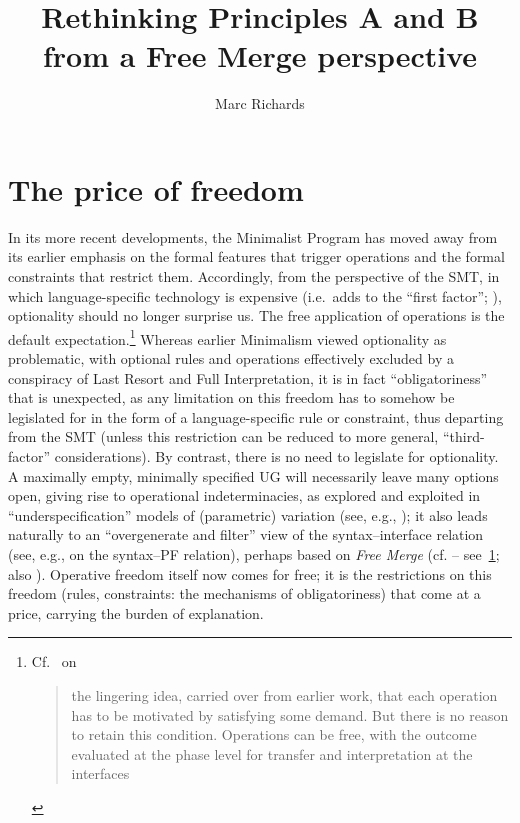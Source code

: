 \documentclass[output=paper]{langsci/langscibook}
\author{Marc Richards\affiliation{Queen's University Belfast}}
\title{Rethinking Principles A and B from a Free Merge perspective}
\begin{document}
\glsresetall

\section{The price of freedom}\label{sec:key:22.1}

In its more recent developments, the Minimalist Program has moved away from its
earlier emphasis on the formal features that trigger operations and the formal
constraints that restrict them. Accordingly, from the perspective of the
\gls{SMT}, in which language-specific technology is expensive (i.e.\ adds to
the \enquote{first factor}; \citealt{Chomsky2005}), optionality should no
longer surprise us. The free application of operations is the default
expectation.\footnote{Cf.\ \citet[10--11]{Chomsky2015} on \blockquote{the
        lingering idea, carried over from earlier work, that each operation has
        to be motivated by satisfying some demand.  But there is no reason to
        retain this condition.  Operations can be free, with the outcome
evaluated at the phase level for transfer and interpretation at the
interfaces}.\label{fn:22.1}} Whereas earlier Minimalism \citep{Chomsky1995}
viewed optionality as problematic, with optional rules and operations
effectively excluded by a conspiracy of Last Resort and Full Interpretation, it
is in fact \enquote{obligatoriness} that is unexpected, as any limitation on
this freedom has to somehow be legislated for in the form of a
language-specific rule or constraint, thus departing from the \gls{SMT} (unless
this restriction can be reduced to more general, \enquote{third-factor}
considerations). By contrast, there is no need to legislate for optionality. A
maximally empty, minimally specified \gls{UG} will necessarily
leave many options open, giving rise to operational indeterminacies, as
explored and exploited in \enquote{underspecification} models of (parametric)
variation (see, e.g.,
\citealt{Uriagereka1994,BibRich2006,BerCho2011,Richards2008b,Kandybowicz2009,Boeckx2011b,RobHol2010});
it also leads naturally to an \enquote{overgenerate and filter} view of the
syntax--interface relation (see, e.g., \citealt{Richards2004,Richards2007b} on the
syntax--\gls{PF} relation), perhaps based on \emph{Free Merge} (cf.
\citealt{Chomsky2007,Chomsky2008,Chomsky2013,Chomsky2015} --
see~\cref{fn:22.1}; also \citealt{Boeckx2011b}). Operative freedom itself now
comes for free; it is the restrictions on this freedom (rules, constraints: the
mechanisms of obligatoriness) that come at a price, carrying the burden of
explanation.
\end{document}
